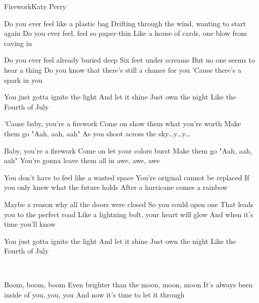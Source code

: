 \begin{Song}{Firework}{Katy Perry}
\begin{multicols}{2}

\begin{Verse}
Do you ever feel like a plastic bag
Drifting through the wind, wanting to start again
Do you ever feel, feel so paper-thin
Like a house of cards, one blow from caving in
\espaceInterStrophe

Do you ever feel already buried deep
Six feet under screams
But no one seems to hear a thing
Do you know that there's still a chance for you
'Cause there's a spark in you
\end{Verse}
\espaceInterStrophe

\begin{PreChorus}
You just gotta ignite the light
And let it shine
Just own the night
Like the Fourth of July
\end{PreChorus}
\espaceInterStrophe

\begin{Chorus}
'Cause baby, you're a firework
Come on show them what you're worth
Make them go "Aah, aah, aah"
As you shoot across the sky\dots y\dots y\dots
\espaceInterStrophe

Baby, you're a firework
Come on let your colors burst
Make them go "Aah, aah, aah"
You're gonna leave them all in awe, awe, awe
\end{Chorus}
\vfill
\columnbreak

\begin{Verse}
You don't have to feel like a wasted space
You're original cannot be replaced
If you only knew what the future holds
After a hurricane comes a rainbow
\espaceInterStrophe

Maybe a reason why all the doors were closed
So you could open one
That leads you to the perfect road
Like a lightning bolt, your heart will glow
And when it's time you'll know
\end{Verse}
\espaceInterStrophe

\begin{PreChorus}
You just gotta ignite the light
And let it shine
Just own the night
Like the Fourth of July
\end{PreChorus}
\espaceInterStrophe

\tochorus\\
\espaceInterStrophe

\begin{Bridge}
Boom, boom, boom
Even brighter than the moon, moon, moon
It's always been inside of you, you, you
And now it's time to let it through
\end{Bridge}
\espaceInterStrophe


\end{multicols}
\end{Song}
